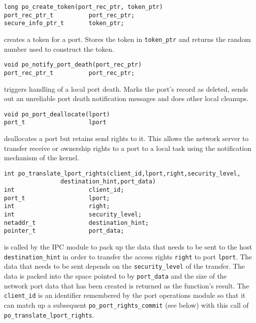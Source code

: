 \begin{verbatim}
long po_create_token(port_rec_ptr, token_ptr)
port_rec_ptr_t          port_rec_ptr;
secure_info_ptr_t       token_ptr;
\end{verbatim}
creates a token for a port.  Stores the token in \verb"token_ptr" and
returns the random number used to construct the token.

\begin{verbatim}
void po_notify_port_death(port_rec_ptr)
port_rec_ptr_t          port_rec_ptr;
\end{verbatim}
triggers handling of a local port death.  Marks the port's record as
deleted, sends out an unreliable port death notification messages and does
other local cleanups.

\begin{verbatim}
void po_port_deallocate(lport)
port_t                  lport
\end{verbatim}
deallocates a port but retains send rights to it.  This allows the network
server to transfer receive or ownership rights to a port to a local task
using the notification mechanism of the kernel.

\begin{verbatim}
int po_translate_lport_rights(client_id,lport,right,security_level,
                destination_hint,port_data)
int                     client_id;
port_t                  lport;
int                     right;
int                     security_level;
netaddr_t               destination_hint;
pointer_t               port_data;
\end{verbatim}
is called by the IPC module to pack up the data that needs to be sent to the
host \verb"destination_hint" in order to transfer the access rights
\verb"right" to port \verb"lport".  The data that needs to be sent depends
on the \verb"security_level" of the transfer.  The data is packed into the
space pointed to by \verb"port_data" and the size of the network port data
that has been created is returned as the function's result.  The
\verb"client_id" is an identifier remembered by the port operations module
so that it can match up a subsequent \verb"po_port_rights_commit" (see below)
with this call of \verb"po_translate_lport_rights".

